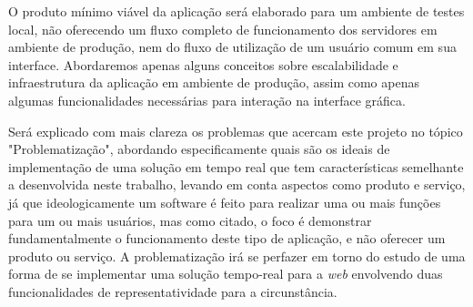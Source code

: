 O produto mínimo viável da aplicação será elaborado para um ambiente de testes local, não oferecendo um fluxo completo de funcionamento dos servidores em ambiente de produção, nem do fluxo de utilização de um usuário comum em sua interface. Abordaremos apenas alguns conceitos sobre escalabilidade e infraestrutura da aplicação em ambiente de produção, assim como apenas algumas funcionalidades necessárias para interação na interface gráfica.

Será explicado com mais clareza os problemas que acercam este projeto no tópico "Problematização", abordando especificamente quais são os ideais de implementação de uma solução em tempo real que tem características semelhante a desenvolvida neste trabalho, levando em conta aspectos como produto e serviço, já que ideologicamente um software é feito para realizar uma ou mais funções para um ou mais usuários, mas como citado, o foco é demonstrar fundamentalmente o funcionamento deste tipo de aplicação, e não oferecer um produto ou serviço. A problematização irá se perfazer em torno do estudo de uma forma de se implementar uma solução tempo-real para a \textit{web} envolvendo duas funcionalidades de representatividade para a circunstância.
